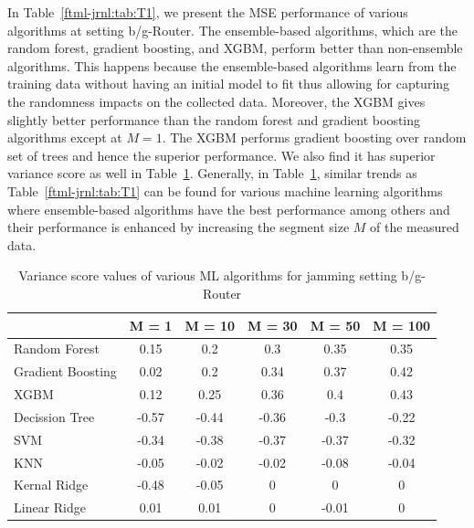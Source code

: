 In Table~\ref{ftml-jrnl:tab:T1}, we present the MSE performance of various algorithms at setting b/g-Router. The ensemble-based algorithms, which are the random forest, gradient boosting, and XGBM, perform better than non-ensemble algorithms. This happens because the ensemble-based algorithms learn from the training data without having an initial model to fit thus allowing for capturing the randomness impacts on the collected data. Moreover, the XGBM gives slightly better performance than the random forest and gradient boosting algorithms except at $M=1$. The XGBM performs gradient boosting over random set of trees and hence the superior performance. We also find it has superior variance score as well in Table~\ref{ftml-jrnl:tab:T2}. Generally, in Table~\ref{ftml-jrnl:tab:T2}, similar trends as Table~\ref{ftml-jrnl:tab:T1} can be found for various machine learning algorithms where ensemble-based algorithms have the best performance among others and their performance is enhanced by increasing the segment size $M$ of the measured data.

\begin{table}[!ht]
	\centering
	\caption{Variance score values of various ML algorithms for jamming setting b/g-Router}
	\begin{tabular}{|p{5.3em}|c|c|c|c|c|}
		\toprule
		& \multicolumn{1}{p{2.4em}|}{M = 1} & \multicolumn{1}{p{2.9em}|}{M = 10} & \multicolumn{1}{p{2.9em}|}{M = 30} & \multicolumn{1}{p{2.9em}|}{M = 50} & \multicolumn{1}{p{3.4em}|}{M = 100} \\
		\midrule
		Random Forest	 & 0.15  & 0.2   & 0.3   & 0.35  & 0.35 \\
		\midrule
		Gradient Boosting  & 0.02  & 0.2   & 0.34  & 0.37  & 0.42 \\
		\midrule
		XGBM  & 0.12  & 0.25  & 0.36  & 0.4   & 0.43 \\
		\midrule
		Decission Tree & -0.57 & -0.44 & -0.36 & -0.3  & -0.22 \\
		\midrule
		SVM   & -0.34 & -0.38 & -0.37 & -0.37 & -0.32 \\
		\midrule
		KNN   & -0.05 & -0.02 & -0.02 & -0.08 & -0.04 \\
		\midrule
		Kernal Ridge & -0.48 & -0.05 & 0     & 0     & 0 \\
		\midrule
		Linear Ridge & 0.01  & 0.01  & 0     & -0.01 & 0 \\
		\bottomrule
	\end{tabular}%
	\label{ftml-jrnl:tab:T2}%
\end{table}%


